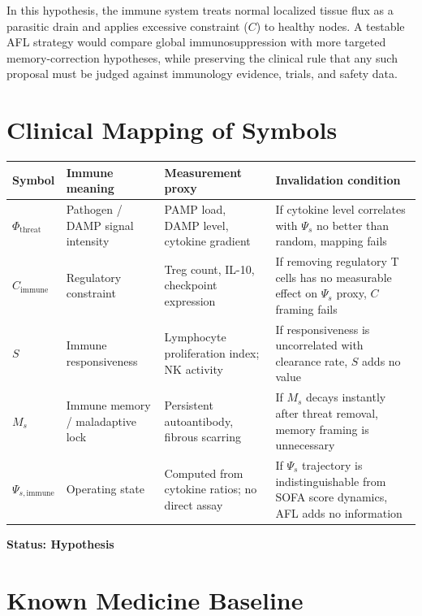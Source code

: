 \documentclass[12pt,a4paper]{article}
\begin{document}
In this hypothesis, the immune system treats normal localized tissue flux as a
parasitic drain and applies excessive constraint ($C$) to healthy nodes. A
testable AFL strategy would compare global immunosuppression with more targeted
memory-correction hypotheses, while preserving the clinical rule that any such
proposal must be judged against immunology evidence, trials, and safety data.

\section{Clinical Mapping of Symbols}

\begin{center}
\begin{tabular}{p{1.8cm}p{3.0cm}p{3.5cm}p{4.5cm}}
\toprule
Symbol & Immune meaning & Measurement proxy & Invalidation condition \\
\midrule
$\Phi_{\mathrm{threat}}$ & Pathogen / DAMP signal intensity & PAMP load, DAMP level, cytokine gradient & If cytokine level correlates with $\Psi_s$ no better than random, mapping fails \\
$C_{\mathrm{immune}}$ & Regulatory constraint & Treg count, IL-10, checkpoint expression & If removing regulatory T cells has no measurable effect on $\Psi_s$ proxy, $C$ framing fails \\
$S$ & Immune responsiveness & Lymphocyte proliferation index; NK activity & If responsiveness is uncorrelated with clearance rate, $S$ adds no value \\
$M_s$ & Immune memory / maladaptive lock & Persistent autoantibody, fibrous scarring & If $M_s$ decays instantly after threat removal, memory framing is unnecessary \\
$\Psi_{s,\mathrm{immune}}$ & Operating state & Computed from cytokine ratios; no direct assay & If $\Psi_s$ trajectory is indistinguishable from SOFA score dynamics, AFL adds no information \\
\bottomrule
\end{tabular}
\end{center}

\textbf{Status: Hypothesis}

\section{Known Medicine Baseline}
\end{document}
